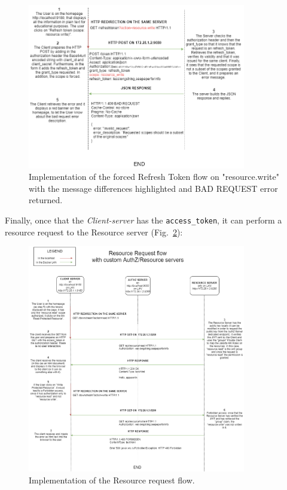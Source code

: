 \begin{figure}[h]
    \centering
    \includegraphics[width=0.85\textwidth]{chapters/images/chp6/flow_refresh3.png}
    \caption{Implementation of the forced Refresh Token flow on "resource.write" with the message differences highlighted and BAD REQUEST error returned.}
    \label{fig:refresh3}
\end{figure}

Finally, once that the \textit{Client-server} has the \texttt{access\_token}, it can perform a resource request to the Resource server (Fig.~\ref{fig:resource}):

\begin{figure}[h]
    \centering
    \includegraphics[width=0.85\textwidth]{chapters/images/chp6/flow_resource.png}
    \caption{Implementation of the Resource request flow.}
    \label{fig:resource}
\end{figure}

